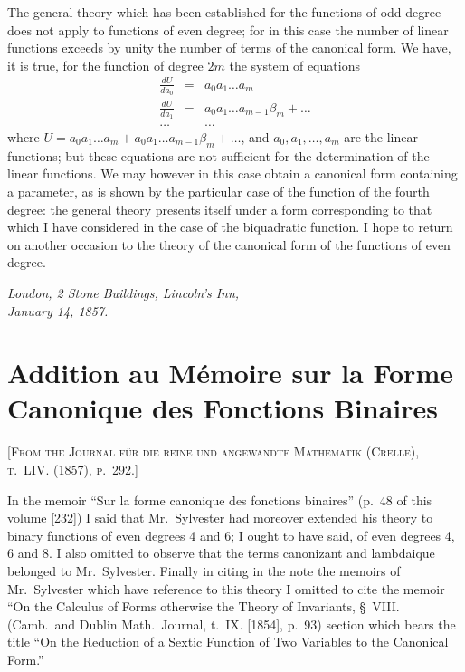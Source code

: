 \documentclass[11pt,a4paper]{article}
\begin{document}
The general theory which has been established for the functions of odd degree does not apply to functions of even degree; for in this case the number of linear functions exceeds by unity the number of terms of the canonical form. We have, it is true, for the function of degree $2m$ the system of equations
\[
\renewcommand{\arraystretch}{1.2}
\begin{array}{rcl}
\frac{dU}{da_0} &=& a_0 a_1 \ldots a_m \\
\frac{dU}{da_1} &=& a_0 a_1 \ldots a_{m-1} \beta_m + \ldots \\
\ldots  & &  \ldots
\end{array}
\]
where $U = a_0a_1\ldots a_m + a_0a_1\ldots a_{m-1}\beta_m + \ldots$, and $a_0, a_1, \ldots, a_m$ are the linear functions; but these equations are not sufficient for the determination of the linear functions. We may however in this case obtain a canonical form containing a parameter, as is shown by the particular case of the function of the fourth degree: the general theory presents itself under a form corresponding to that which I have considered in the case of the biquadratic function. I hope to return on another occasion to the theory of the canonical form of the functions of even degree.

\medskip
\noindent\textit{London, 2 Stone Buildings, Lincoln's Inn,\\January 14, 1857.}

\newpage


\section{Addition au Mémoire sur la Forme Canonique des Fonctions Binaires}

\textsc{[From the Journal für die reine und angewandte Mathematik (Crelle), t.~LIV. (1857), p.~292.]}
\label{paper:233}

\setcounter{page}{53}

In the memoir ``Sur la forme canonique des fonctions binaires'' (p.~48 of this volume [232]) I said that Mr.~Sylvester had moreover extended his theory to binary functions of even degrees 4 and 6; I ought to have said, of even degrees 4, 6 and 8. I also omitted to observe that the terms canonizant and lambdaique belonged to Mr.~Sylvester. Finally in citing in the note the memoirs of Mr.~Sylvester which have reference to this theory I omitted to cite the memoir ``On the Calculus of Forms otherwise the Theory of Invariants, \S~VIII. (Camb.\ and Dublin Math.\ Journal, t.~IX. [1854], p.~93) section which bears the title ``On the Reduction of a Sextic Function of Two Variables to the Canonical Form.''
\end{document}
